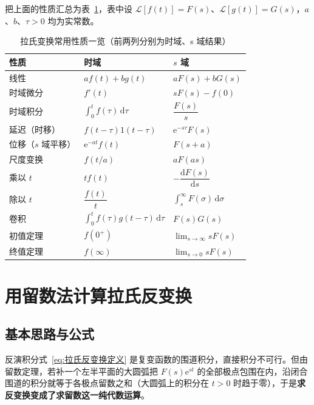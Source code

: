 把上面的性质汇总为表~\ref{tab:拉氏变换性质}，表中设 $\mathcal{L}[f(t)]=F(s)$、$\mathcal{L}[g(t)]=G(s)$，$a$、$b$、$\tau>0$ 均为实常数。

\begin{table}[H]
\centering
\caption{拉氏变换常用性质一览（前两列分别为时域、s 域结果）}
\label{tab:拉氏变换性质}
\renewcommand{\arraystretch}{1.45}
\begin{tabular}{lll}
\toprule
性质 & 时域 & $s$ 域 \\
\midrule
线性 & $af(t)+bg(t)$ & $aF(s)+bG(s)$ \\
时域微分 & $f'(t)$ & $sF(s)-f(0)$ \\
时域积分 & $\displaystyle\int_{0}^{t}f(\tau)\,\mathrm{d}\tau$ & $\dfrac{F(s)}{s}$ \\
延迟（时移） & $f(t-\tau)1(t-\tau)$ & $\mathrm{e}^{-s\tau}F(s)$ \\
位移（$s$ 域平移） & $\mathrm{e}^{-at}f(t)$ & $F(s+a)$ \\
尺度变换 & $f(t/a)$ & $aF(as)$ \\
乘以 $t$ & $tf(t)$ & $-\dfrac{\mathrm{d}F(s)}{\mathrm{d}s}$ \\
除以 $t$ & $\dfrac{f(t)}{t}$ & $\displaystyle\int_{s}^{\infty}F(\sigma)\,\mathrm{d}\sigma$ \\
卷积 & $\displaystyle\int_{0}^{t}f(\tau)g(t-\tau)\,\mathrm{d}\tau$ & $F(s)G(s)$ \\
初值定理 & $f(0^{+})$ & $\displaystyle\lim_{s\to\infty}sF(s)$ \\
终值定理 & $f(\infty)$ & $\displaystyle\lim_{s\to0}sF(s)$ \\
\bottomrule
\end{tabular}
\end{table}

\section{用留数法计算拉氏反变换}
\label{sec:用留数法计算拉氏反变换}

\subsection{基本思路与公式}

反演积分式~\eqref{eq:拉氏反变换定义} 是复变函数的围道积分，直接积分不可行。但由留数定理，若补一个左半平面的大圆弧把 $F(s)\mathrm{e}^{st}$ 的全部极点包围在内，沿闭合围道的积分就等于各极点留数之和（大圆弧上的积分在 $t>0$ 时趋于零），于是\textbf{求反变换变成了求留数这一纯代数运算}。

